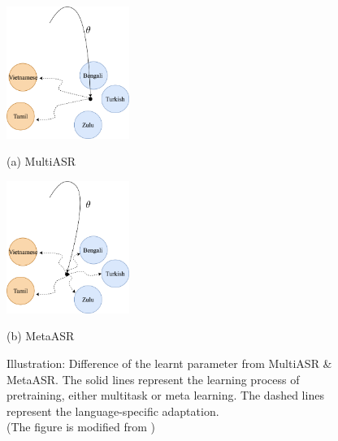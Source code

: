 \begin{figure}[htb]

\begin{minipage}[b]{0.48\linewidth}
  \centering
  \centerline{\includegraphics[width=4.0cm]{figs/multi_process.png}}
  \centerline{(a) MultiASR}\medskip
\end{minipage}
\hfill
\begin{minipage}[b]{0.48\linewidth}
  \centering
  \centerline{\includegraphics[width=4.0cm]{figs/meta_process.png}}
  \centerline{(b) MetaASR}\medskip
\end{minipage}
%
\caption{Illustration: Difference of the learnt parameter from MultiASR \& MetaASR. The solid lines represent the learning process of pretraining, either multitask or meta learning. The dashed lines represent the language-specific adaptation.\\ (The figure is modified from \cite{gu2018meta})}
\label{fig:meta-idea}
%
\end{figure}

